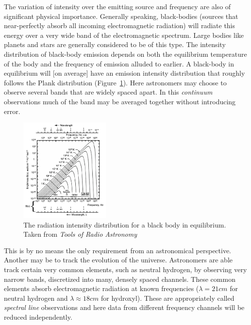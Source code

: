 The variation of intensity over the emitting source and frequency are also of significant physical importance. Generally speaking, black-bodies (sources that near-perfectly absorb all incoming electromagnetic radiation)
will radiate this energy over a very wide band of the electromagnetic spectrum. Large bodies like planets and stars are generally considered to be of 
this type. The intensity distribution of black-body emission depends on both the equilibrium temperature of the body and the frequency of emission alluded 
to earlier. A black-body in equilibrium will [on average] have an emission intensity distribution that roughly follows the Plank 
distribution (Figure~\ref{fig_plank}). Here astronomers may choose to observe several bands that are widely spaced apart. In this \textit{continuum} 
observations much of the band may be averaged together without introducing error.

\begin{figure}[ht]
 \begin{mdframed}
 \centering
 \includegraphics[width=0.4\textwidth]{images/plank_dist.png}
 \caption[Plank distribution]{The radiation intensity distribution for a black body in equilibrium. Taken from \textit{Tools of Radio Astronomy} \cite{wilson2009tools}}
  \label{fig_plank}
 \end{mdframed}
\end{figure}

This is by no means the only requirement from an astronomical perspective. Another may be to track the evolution of the universe. Astronomers are able
track certain very common elements, such as neutral hydrogen, by observing very narrow bands, discretized into many, densely spaced 
channels. These common elements absorb electromagnetic radiation at known frequencies ($\lambda = 21 cm$ for neutral hydrogen and
$\lambda \approx 18 cm$ for hydroxyl). These are appropriately called \textit{spectral line} observations and here data from different frequency channels
will be reduced independently.

